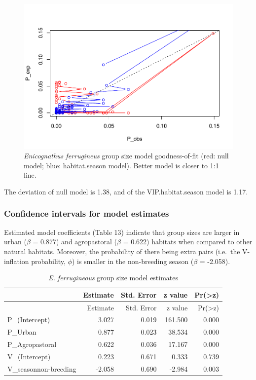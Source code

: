\documentclass[]{article}
\begin{document}
\begin{figure}[H]
\includegraphics{Patagonia_parrots_density_analysis_files/figure-latex/unnamed-chunk-16-1} \caption{\textit{Enicognathus ferrugineus} group size model goodness-of-fit (red: null model; blue: habitat.season model). Better model is closer to 1:1 line.}\label{fig:unnamed-chunk-16}
\end{figure}

The deviation of null model is 1.38, and of the VIP.habitat.season model
is 1.17.

\subsubsection{Confidence intervals for model
estimates}\label{confidence-intervals-for-model-estimates}

Estimated model coefficients (Table 13) indicate that group sizes are
larger in urban (\(\beta\) = 0.877) and agropastoral (\(\beta\) = 0.622)
habitats when compared to other natural habitats. Moreover, the
probability of there being extra pairs (i.e.~the V-inflation
probability, \(\phi\)) is smaller in the non-breeding season (\(\beta\)
= -2.058).

\begin{longtable}[]{@{}lrrrr@{}}
\caption{\textit{E. ferrugineous} group size model
estimates}\tabularnewline
\toprule
& Estimate & Std. Error & z value &
Pr(\textgreater{}\textbar{}z\textbar{})\tabularnewline
\midrule
\endfirsthead
\toprule
& Estimate & Std. Error & z value &
Pr(\textgreater{}\textbar{}z\textbar{})\tabularnewline
\midrule
\endhead
P\_(Intercept) & 3.027 & 0.019 & 161.500 & 0.000\tabularnewline
P\_Urban & 0.877 & 0.023 & 38.534 & 0.000\tabularnewline
P\_Agropastoral & 0.622 & 0.036 & 17.167 & 0.000\tabularnewline
V\_(Intercept) & 0.223 & 0.671 & 0.333 & 0.739\tabularnewline
V\_seasonnon-breeding & -2.058 & 0.690 & -2.984 & 0.003\tabularnewline
\bottomrule
\end{longtable}
\end{document}

